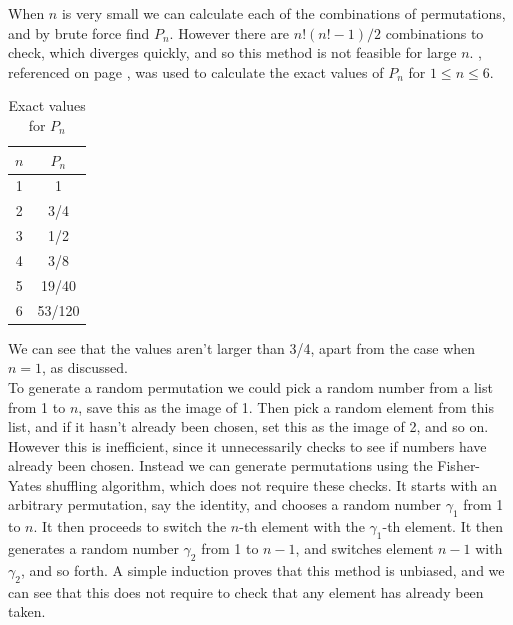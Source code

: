 \documentclass[10pt,a4paper,notitlepage]{article}
\begin{document}
When $n$ is very small we can calculate each of the combinations of permutations, and by brute force find $P_{n}$. However there are $n!(n!-1)/2$ combinations to check, which diverges quickly, and so this method is not feasible for large $n$. , referenced on page \pageref{cd:9.1}, was used to calculate the exact values of $P_{n}$ for $1\leq n\leq 6$. 
\begin{table}[H]
\centering
\begin{tabular}{|c|c|}
\hline $n$ & $P_{n}$ \\
\hline 1 & 1\\
2 & 3/4\\
3 & 1/2\\
4 & 3/8\\
5 & 19/40\\
6 & 53/120\\
\hline
\end{tabular}
\caption{Exact values for $P_{n}$}\label{tb:Exact P_n}
\end{table}

We can see that the values aren't larger than 3/4, apart from the case when $n=1$, as discussed. \\

To generate a random permutation we could pick a random number from a list from 1 to $n$, save this as the image of 1. Then pick a random element from this list, and if it hasn't already been chosen, set this as the image of 2, and so on. However this is inefficient, since it unnecessarily checks to see if numbers have already been chosen. Instead we can generate permutations using the Fisher-Yates shuffling algorithm, which does not require these checks. It starts with an arbitrary permutation, say the identity, and chooses a random number $\gamma_{1}$ from 1 to $n$. It then proceeds to switch the $n$-th element with the $\gamma_{1}$-th element. It then generates a random number $\gamma_{2}$ from 1 to $n-1$, and switches element $n-1$ with $\gamma_{2}$, and so forth. A simple induction proves that this method is unbiased, and we can see that this does not require to check that any element has already been taken. 
\end{document}

